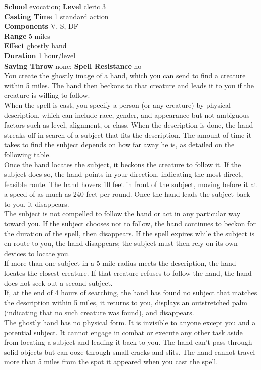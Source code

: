 \textbf{School} evocation; \textbf{Level} cleric 3\\
\textbf{Casting Time} 1 standard action\\
\textbf{Components} V, S, DF\\
\textbf{Range} 5 miles\\
\textbf{Effect} ghostly hand\\
\textbf{Duration} 1 hour/level\\
\textbf{Saving Throw} none; \textbf{Spell Resistance} no\\
You create the ghostly image of a hand, which you can send to find a creature within 5 miles. The hand then beckons to that creature and leads it to you if the creature is willing to follow.\\
When the spell is cast, you specify a person (or any creature) by physical description, which can include race, gender, and appearance but not ambiguous factors such as level, alignment, or class. When the description is done, the hand streaks off in search of a subject that fits the description. The amount of time it takes to find the subject depends on how far away he is, as detailed on the following table.\\
Once the hand locates the subject, it beckons the creature to follow it. If the subject does so, the hand points in your direction, indicating the most direct, feasible route. The hand hovers 10 feet in front of the subject, moving before it at a speed of as much as 240 feet per round. Once the hand leads the subject back to you, it disappears.\\
The subject is not compelled to follow the hand or act in any particular way toward you. If the subject chooses not to follow, the hand continues to beckon for the duration of the spell, then disappears. If the spell expires while the subject is en route to you, the hand disappears; the subject must then rely on its own devices to locate you.\\
If more than one subject in a 5-mile radius meets the description, the hand locates the closest creature. If that creature refuses to follow the hand, the hand does not seek out a second subject.\\
If, at the end of 4 hours of searching, the hand has found no subject that matches the description within 5 miles, it returns to you, displays an outstretched palm (indicating that no such creature was found), and disappears.\\
The ghostly hand has no physical form. It is invisible to anyone except you and a potential subject. It cannot engage in combat or execute any other task aside from locating a subject and leading it back to you. The hand can't pass through solid objects but can ooze through small cracks and slits. The hand cannot travel more than 5 miles from the spot it appeared when you cast the spell.\\
